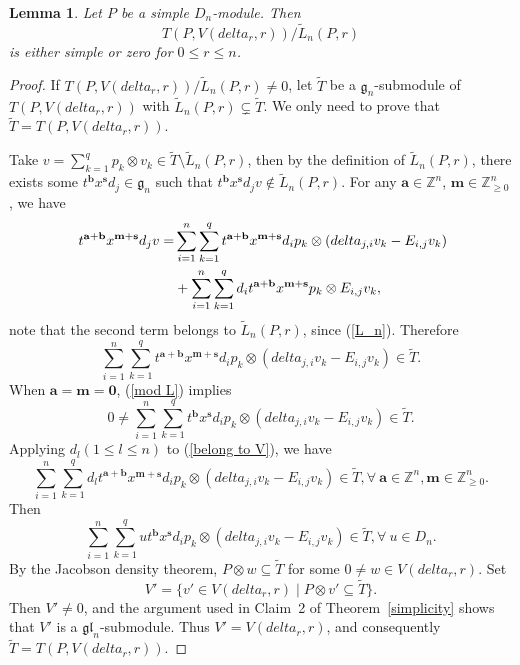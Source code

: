 \documentclass[12pt,a4paper]{amsart}
\def\mg{g}%
\def\gl{gl}%
\def\delta{delta}%
\newtheorem{lemma}[theorem]{Lemma}%
\numberwithin{equation}{section}
\newcommand{\Z}{\mathbb{Z}}
\def\mg{\mathfrak{g}}
\def\gl{\mathfrak{gl}}
\def\ba{\mathbf{a}}
\def\bs{\mathbf{s}}
\def\bm{\mathbf{m}}
\def\bb{\mathbf{b}}
\begin{document}
\begin{lemma}\label{irreducible}
Let \(P\) be a simple \(D_n\)-module. Then
\[
T(P,V(\delta_r,r))/\tilde L_n(P,r)
\]
is either simple or zero for \(0\leq r\leq n\).
\end{lemma}
\begin{proof}
If $T(P,V(\delta_r,r))/\tilde{L}_n(P,r)\neq0$, let $\tilde{T}$ be a $\mg_n$-submodule of $T(P,V(\delta_r,r))$ with $\tilde{L}_n(P,r)\subsetneq \tilde{T}$. We only need to prove that
$\tilde{T}=T(P,V(\delta_r,r))$.

Take $v=\sum^q_{k=1}p_k\otimes v_k\in \tilde{T} \setminus \tilde{L}_n(P,r)$, then by the definition of $\tilde{L}_n(P,r)$, there exists some $t^{\bb}x^{\bs}d_j\in \mg_n$ such that $t^{\bb}x^{\bs}d_j v\notin \tilde{L}_n(P,r)$. For any $\ba\in \Z^n$, $\bm\in \Z^n_{\geq0}$, we have
\begin{equation}\label{mod L}
\aligned \
t^{\ba+\bb}x^{\bm+\bs}d_j v=&\sum^n_{i=1}\sum^q_{k=1}t^{\ba+\bb}x^{\bm+\bs}d_ip_k\otimes (\delta_{j,i}v_k-E_{i,j}v_k)\\
&+\sum^n_{i=1}\sum^q_{k=1}d_it^{\ba+\bb}x^{\bm+\bs}p_k\otimes E_{i,j}v_k,
\endaligned
\end{equation}
note that the second term belongs to $\tilde{L}_n(P,r)$, since (\ref{L_n}). Therefore
\begin{equation}\label{belong to V}
\sum^n_{i=1}\sum^q_{k=1}t^{\ba+\bb}x^{\bm+\bs}d_ip_k\otimes (\delta_{j,i}v_k-E_{i,j}v_k)\in \tilde{T}.
\end{equation}
When $\ba=\bm=\mathbf{0}$, (\ref{mod L}) implies
$$0\neq \sum^n_{i=1}\sum^q_{k=1}t^{\bb}x^{\bs}d_ip_k\otimes (\delta_{j,i}v_k-E_{i,j}v_k)\in \tilde{T}.$$
Applying $d_l(1\leq l\leq n)$ to (\ref{belong to V}), we have
$$\sum^n_{i=1}\sum^q_{k=1}d_lt^{\ba+\bb}x^{\bm+\bs}d_ip_k\otimes (\delta_{j,i}v_k-E_{i,j}v_k)\in \tilde{T}, \forall\ \ba\in \Z^n, \bm\in \Z^n_{\geq0}.$$
Then
$$\sum^n_{i=1}\sum^q_{k=1}ut^{\bb}x^{\bs}d_ip_k\otimes (\delta_{j,i}v_k-E_{i,j}v_k)\in \tilde{T}, \forall\  u\in D_n.$$
By the Jacobson density theorem,
\(P\otimes w\subseteq\tilde T\) for some
\(0\neq w\in V(\delta_r,r)\). Set
\[
V'=\{v'\in V(\delta_r,r)\mid P\otimes v'\subseteq\tilde T\}.
\]
Then \(V'\neq0\), and the argument used in Claim~2 of
Theorem~\ref{simplicity} shows that \(V'\) is a
\(\gl_n\)-submodule. Thus \(V'=V(\delta_r,r)\), and consequently
\(\tilde T=T(P,V(\delta_r,r))\).
\end{proof}
\end{document}
